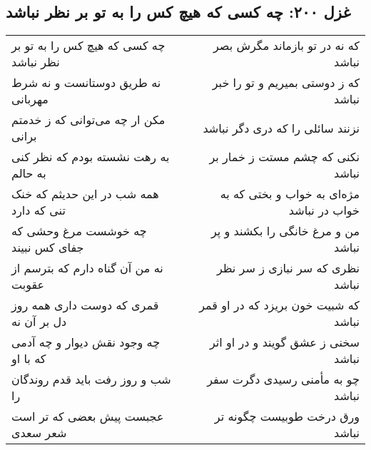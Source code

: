 \begin{center}
\section*{غزل ۲۰۰: چه کسی که هیچ کس را به تو بر نظر نباشد}
\label{sec:200}
\begin{longtable}{l p{0.5cm} r}
چه کسی که هیچ کس را به تو بر نظر نباشد
&&
که نه در تو بازماند مگرش بصر نباشد
\\
نه طریق دوستانست و نه شرط مهربانی
&&
که ز دوستی بمیریم و تو را خبر نباشد
\\
مکن ار چه می‌توانی که ز خدمتم برانی
&&
نزنند سائلی را که دری دگر نباشد
\\
به رهت نشسته بودم که نظر کنی به حالم
&&
نکنی که چشم مستت ز خمار بر نباشد
\\
همه شب در این حدیثم که خنک تنی که دارد
&&
مژه‌ای به خواب و بختی که به خواب در نباشد
\\
چه خوشست مرغ وحشی که جفای کس نبیند
&&
من و مرغ خانگی را بکشند و پر نباشد
\\
نه من آن گناه دارم که بترسم از عقوبت
&&
نظری که سر نبازی ز سر نظر نباشد
\\
قمری که دوست داری همه روز دل بر آن نه
&&
که شبیت خون بریزد که در او قمر نباشد
\\
چه وجود نقش دیوار و چه آدمی که با او
&&
سخنی ز عشق گویند و در او اثر نباشد
\\
شب و روز رفت باید قدم روندگان را
&&
چو به مأمنی رسیدی دگرت سفر نباشد
\\
عجبست پیش بعضی که تر است شعر سعدی
&&
ورق درخت طوبیست چگونه تر نباشد
\\
\end{longtable}
\end{center}
